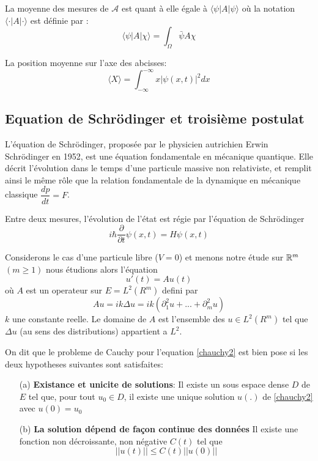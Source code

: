 La moyenne des mesures de $\mathcal{A}$ est quant à elle égale à $\langle\psi|A|\psi\rangle$ où la notation $\langle\cdot|A|\cdot\rangle$ est définie par :
\begin{equation}
\langle\psi|A|\chi\rangle = \int_{\Omega} \bar{\psi}A\chi
\end{equation}
\begin{ex}
	La position moyenne sur l’axe des abcisses:
	\begin{equation*}
	\langle X \rangle = \int_{- \infty}^{- \infty} x |\psi(x,t)|^2 dx
	\end{equation*}
\end{ex}

\subsection{Equation de Schrödinger et troisième postulat}
L'équation de Schrödinger, proposée par le physicien autrichien Erwin Schrödinger en 1952, est une équation fondamentale en mécanique quantique. Elle décrit l'évolution dans le temps d’une particule massive non relativiste, et remplit ainsi le même rôle que la relation fondamentale de la dynamique en mécanique classique $\dfrac{dp}{dt}=F$.
\begin{Post}
	Entre deux mesures, l’évolution de l’état est régie par l’équation de Schrödinger
	\begin{equation} \label{sch1}
	i\hbar \dfrac{\partial }{\partial t} \psi (x,t) = H\psi (x,t)
	\end{equation}
\end{Post}
Considerons le cas d'une particule libre ($V=0$) et menons notre étude sur $\mathbb R^m$ $(m \geq 1)$ nous étudions alors l'équation
\begin{equation} \label{chauchy2}
u'(t)=Au(t)
\end{equation}
où $A$ est un operateur sur $E=L^2(R^m)$ defini par 
$$
Au=ik\Delta u=ik(\partial_{1}^2u+...+\partial_{m}^2u)
$$
$k$ une constante reelle. Le domaine de $A$ est l'ensemble des $u \in L^2(R^m)$ tel que $\Delta u$ (au sens des distributions) appartient a $L^2$.
\begin{definition}
	On dit que le probleme de Cauchy pour l'equation \eqref{chauchy2} est bien pose si les deux hypotheses suivantes sont satisfaites:
	\begin{enumerate}
		\item[(a)] \textbf{Existance et unicite de solutions}: Il existe un sous espace dense $D$ de $E$ tel que, pour tout $u_0 \in D$, il existe une unique solution $u(.)$ de \eqref{chauchy2} avec $u(0)=u_0$
		\item[(b)] \textbf{La solution dépend de façon continue des données} Il existe une fonction non décroissante, non négative $C(t)$ tel que
		$$
		||u(t)||\leq C(t) ||u(0)||
		$$
	\end{enumerate}
\end{definition}
